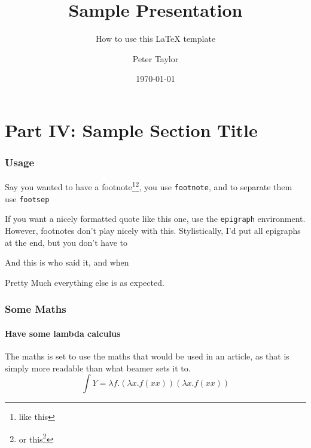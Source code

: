 \documentclass[aspectratio=169]{beamer}
\title{Sample Presentation}
\subtitle{How to use this \LaTeX{ } template}
\author{Peter Taylor}
\date{\today}
\begin{document}
\maketitleslide

\section{Part IV: Sample Section Title}
\begin{frame}

  \frametitle{Usage}
  Say you wanted to have a footnote\footnote{like this}\footsep\footnote{or this\footnote{Unfortunately, nested footnotes don't work}}, you use \texttt{footnote}, and to separate them use \texttt{footsep}\par

  \epigraph{If you want a nicely formatted quote like this one, use the \texttt{epigraph} environment. However, footnotes don't play nicely with this. Stylistically, I'd put all epigraphs at the end, but you don't have to}{And this is who said it, and when}

  Pretty Much everything else is as expected.
\end{frame}

\begin{frame}
  \frametitle{Some Maths}
  \framesubtitle{Have some lambda calculus}
  The maths is set to use the maths that would be used in an article, as that is simply more readable than what beamer sets it to.
  $$\int Y = \lambda f. (\lambda x. f (x x)) (\lambda x. f (x x))$$

\end{frame}
\end{document}
